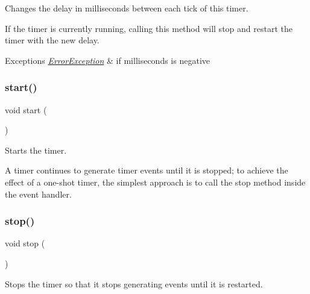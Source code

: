 Changes the delay in milliseconds between each tick of this timer. 

If the timer is currently running, calling this method will stop and restart the timer with the new delay.


\begin{DoxyExceptions}{Exceptions}
{\em \mbox{\hyperlink{classErrorException}{Error\+Exception}}} & if milliseconds is negative \\
\hline
\end{DoxyExceptions}
\mbox{\label{classGTimer_a60de64d75454385b23995437f1d72669}} 
\subsubsection{\texorpdfstring{start()}{start()}}
{\footnotesize\ttfamily void start (\begin{DoxyParamCaption}{ }\end{DoxyParamCaption})}



Starts the timer. 

A timer continues to generate timer events until it is stopped; to achieve the effect of a one-\/shot timer, the simplest approach is to call the {\ttfamily stop} method inside the event handler. \mbox{\label{classGTimer_a8c528baf37154d347366083f0f816846}} 
\subsubsection{\texorpdfstring{stop()}{stop()}}
{\footnotesize\ttfamily void stop (\begin{DoxyParamCaption}{ }\end{DoxyParamCaption})}



Stops the timer so that it stops generating events until it is restarted. 

